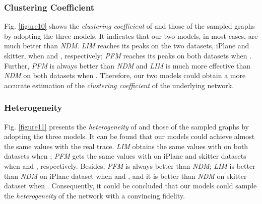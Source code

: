 \documentclass[a4paper]{llncs}
\begin{document}
\subsubsection{Clustering Coefficient}
Fig. \ref{figure10} shows the {\it clustering coefficient} of  and those of the sampled graphs by adopting the three models. It indicates that our two models, in most cases, are much better than \textit{NDM}. \textit{LIM} reaches its peaks on the two datasets, iPlane and skitter, when  and , respectively; \textit{PFM} reaches its peaks on both datasets when . Further, \textit{PFM} is always better than \textit{NDM} and \textit{LIM} is much more effective than \textit{NDM} on both datasets when . Therefore, our two models could obtain a more accurate estimation of the {\it clustering coefficient} of the underlying network.

\begin{figure*}[!t]
\centering
{}
\hspace{2em}
\vspace{-1.7em}
\caption{The {\it heterogeneity} of the sampled graphs by using the three models, compared with that of , on two real datasets: iPlane and skitter, respectively.}
\label{figure11}
\vspace{-0.5em}
\end{figure*}


\subsubsection{Heterogeneity}
Fig. \ref{figure11} presents the {\it heterogeneity} of 
and those of the sampled graphs by adopting the three models. It can be found that
our models could achieve almost the same values with the real trace. \textit{LIM} obtains the same values with  on both datasets when ; \textit{PFM} gets the same values with  on iPlane and skitter datasets when  and , respectively. Besides, \textit{PFM} is always better than \textit{NDM}; \textit{LIM} is better
than \textit{NDM} on iPlane dataset when  and , and it is better than \textit{NDM} on
skitter dataset when . Consequently, it could be concluded that
our models could sample the {\it heterogeneity} of the network with a convincing fidelity.
\end{document}
